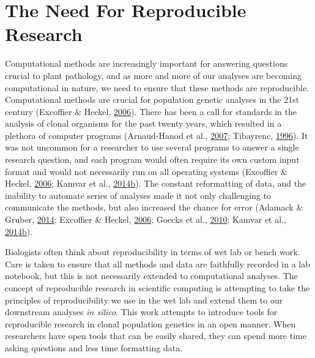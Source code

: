 \documentclass[double,11pt]{beavtex}
\begin{document}
  \section{The Need For Reproducible
  Research}\label{the-need-for-reproducible-research}
  
  Computational methods are increasingly important for answering questions
  crucial to plant pathology, and as more and more of our analyses are
  becoming computational in nature, we need to ensure that these methods
  are reproducible. Computational methods are crucial for population
  genetic analyses in the 21st century (Excoffier \& Heckel,
  \protect\hyperlink{ref-excoffier2006computer}{2006}). There has been a
  call for standards in the analysis of clonal organisms for the past
  twenty years, which resulted in a plethora of computer programs
  (Arnaud-Hanod et al.,
  \protect\hyperlink{ref-arnaud2007standardizing}{2007}; Tibayrenc,
  \protect\hyperlink{ref-tibayrenc1996towards}{1996}). It was not uncommon
  for a researcher to use several programs to answer a single research
  question, and each program would often require its own custom input
  format and would not necessarily run on all operating systems (Excoffier
  \& Heckel, \protect\hyperlink{ref-excoffier2006computer}{2006}; Kamvar
  et al.,
  \protect\hyperlink{ref-kamvar2014poppr}{2014}\protect\hyperlink{ref-kamvar2014poppr}{b}).
  The constant reformatting of data, and the inability to automate series
  of analyses made it not only challenging to communicate the methods, but
  also increased the chance for error (Adamack \& Gruber,
  \protect\hyperlink{ref-adamack2014popgenreport}{2014}; Excoffier \&
  Heckel, \protect\hyperlink{ref-excoffier2006computer}{2006}; Goecks et
  al., \protect\hyperlink{ref-goecks2010galaxy}{2010}; Kamvar et al.,
  \protect\hyperlink{ref-kamvar2014poppr}{2014}\protect\hyperlink{ref-kamvar2014poppr}{b}).
  
  Biologists often think about reproducibility in terms of wet lab or
  bench work. Care is taken to ensure that all methods and data are
  faithfully recorded in a lab notebook, but this is not necessarily
  extended to computational analyses. The concept of reproducible research
  in scientific computing is attempting to take the principles of
  reproducibility we use in the wet lab and extend them to our downstream
  analyses \emph{in silico}. This work attempts to introduce tools for
  reproducible research in clonal population genetics in an open manner.
  When researchers have open tools that can be easily shared, they can
  spend more time asking questions and less time formatting data.
  
\end{document}

